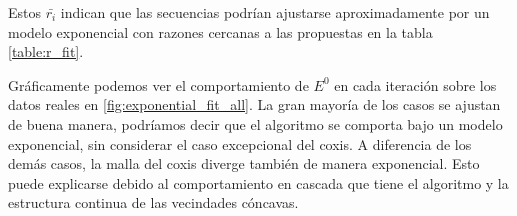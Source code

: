 \begin{itemize}
    Estos $\bar{r_i}$ indican que las secuencias podrían ajustarse aproximadamente por un modelo exponencial con razones cercanas a las propuestas en la tabla \ref{table:r_fit}.

    Gráficamente podemos ver el comportamiento de $E^0$ en cada iteración sobre los datos reales en \autoref{fig:exponential_fit_all}.  La gran mayoría de los casos se ajustan de buena manera, podríamos decir que el algoritmo se comporta bajo un modelo exponencial, sin considerar el caso excepcional del coxis.  A diferencia de los demás casos, la malla del coxis diverge también de manera exponencial.  Esto puede explicarse debido al comportamiento en cascada que tiene el algoritmo y la estructura continua de las vecindades cóncavas.
    
%		



\end{itemize}
